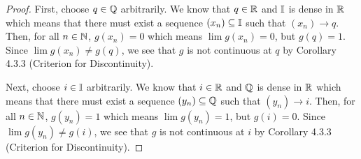 \documentclass[12pt,letterpaper]{article}
\begin{document}
\begin{itemize}[leftmargin=!,labelindent=5pt]
\begin{itemize}
\begin{proof}
                        First, choose $q\in\mathbb{Q}$ arbitrarily.
                        We know that $q \in \mathbb{R}$ and $\mathbb{I}$ is dense in $\mathbb{R}$ which means that there must exist a sequence $(x_n) \subseteq \mathbb{I}$ such that $(x_n) \to q$.
                        Then, for all $n \in \mathbb{N}$, $g(x_n) = 0$ which means $\lim g(x_n) = 0$, but $g(q) = 1$.
                        Since $\lim g(x_n) \neq g(q)$, we see that $g$ is not continuous at $q$ by Corollary 4.3.3 (Criterion for Discontinuity).

                        Next, choose $i \in \mathbb{I}$ arbitrarily.
                        We know that $i \in \mathbb{R}$ and $\mathbb{Q}$ is dense in $\mathbb{R}$ which means that there must exist a sequence $(y_n) \subseteq \mathbb{Q}$ such that $(y_n) \to i$.
                        Then, for all $n \in \mathbb{N}$, $g(y_n) = 1$ which means $\lim g(y_n) = 1$, but $g(i) = 0$.
                        Since $\lim g(y_n) \neq g(i)$, we see that $g$ is not continuous at $i$ by Corollary 4.3.3 (Criterion for Discontinuity).
                        

\end{proof}
\end{itemize}
\end{itemize}
\end{document}
